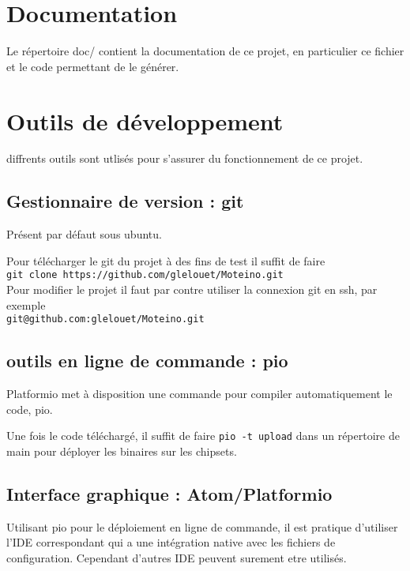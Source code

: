 \documentclass{report}
\begin{document}
\section{Documentation}

Le répertoire doc/ contient la documentation de ce projet, en particulier ce fichier et le code permettant de le générer.

\section{Outils de développement}

diffrents outils sont utlisés pour s'assurer du fonctionnement de ce projet.

\subsection{Gestionnaire de version : git}

Présent par défaut sous ubuntu.

Pour télécharger le git du projet à des fins de test il suffit de faire\\
\verb+git clone https://github.com/glelouet/Moteino.git+\\

Pour modifier le projet il faut par contre utiliser la connexion git en ssh, par exemple\\
\verb+git@github.com:glelouet/Moteino.git+

\subsection{outils en ligne de commande : pio}

Platformio met à disposition une commande pour compiler automatiquement le code, pio.

Une fois le code téléchargé, il suffit de faire \verb+pio -t upload+ dans un répertoire de main pour déployer les binaires sur les chipsets.

\subsection{Interface graphique : Atom/Platformio}

Utilisant pio pour le déploiement en ligne de commande, il est pratique d'utiliser l'IDE correspondant qui a une intégration native avec les fichiers de configuration. Cependant d'autres IDE peuvent surement etre utilisés.
\end{document}
